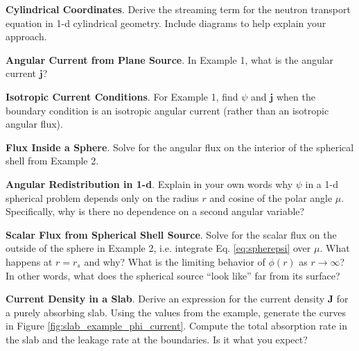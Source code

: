 \begin{exercises}

  \item \textbf{Cylindrical Coordinates}. 
    Derive the streaming term for the neutron transport equation in 1-d 
    cylindrical geometry.  Include diagrams to help explain your approach.
  
  \item \textbf{Angular Current from Plane Source}. 
    In Example 1, what is the angular current $\mathbf{j}$?

  \item \textbf{Isotropic Current Conditions}. 
    For Example 1, find $\psi$ and $\mathbf{j}$ when the boundary 
    condition is an isotropic angular current (rather than an isotropic 
    angular flux).

  \item \textbf{Flux Inside a Sphere}. 
    Solve for the angular flux on the interior of the spherical shell 
    from Example 2.

  \item \textbf{Angular Redistribution in 1-d}. 
    Explain in your own words why $\psi$ in a 1-d spherical problem depends 
    only on the radius $r$ and cosine of the polar angle $\mu$.  Specifically, 
    why is there no dependence on a second angular variable? 

  \item \textbf{Scalar Flux from Spherical Shell Source}. 
    Solve for the scalar flux on the outside of the sphere in Example 2, 
    i.e. integrate Eq. \ref{eq:spherepsi} over $\mu$.  What happens 
    at $r = r_s$ and why?  What is the limiting behavior of $\phi(r)$ 
    as $r\to \infty$?  In other words, what does the spherical 
    source ``look like'' far from its surface?

  \item \textbf{Current Density in a Slab}. 
    Derive an expression for the current density $\mathbf{J}$ for a purely 
    absorbing slab.  Using the values from the example, generate the curves 
    in Figure \ref{fig:slab_example_phi_current}.  Compute the total 
    absorption rate in the slab and the leakage rate at the boundaries.  
    Is it what you expect?


\end{exercises}
